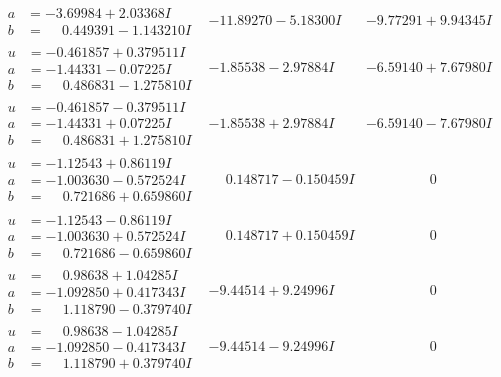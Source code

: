 \documentclass[1p]{elsarticle_modified}
\theoremstyle{definition}
\begin{document}
$$\begin{array}{c|c|c}
\begin{aligned}
a &= -3.69984 + 2.03368 I \\
b &= \phantom{-}0.449391 - 1.143210 I\end{aligned}
 & -11.89270 - 5.18300 I & -9.77291 + 9.94345 I \\ \hline\begin{aligned}
u &= -0.461857 + 0.379511 I \\
a &= -1.44331 - 0.07225 I \\
b &= \phantom{-}0.486831 - 1.275810 I\end{aligned}
 & -1.85538 - 2.97884 I & -6.59140 + 7.67980 I \\ \hline\begin{aligned}
u &= -0.461857 - 0.379511 I \\
a &= -1.44331 + 0.07225 I \\
b &= \phantom{-}0.486831 + 1.275810 I\end{aligned}
 & -1.85538 + 2.97884 I & -6.59140 - 7.67980 I \\ \hline\begin{aligned}
u &= -1.12543 + 0.86119 I \\
a &= -1.003630 - 0.572524 I \\
b &= \phantom{-}0.721686 + 0.659860 I\end{aligned}
 & \phantom{-}0.148717 - 0.150459 I & \phantom{-0.000000 } 0 \\ \hline\begin{aligned}
u &= -1.12543 - 0.86119 I \\
a &= -1.003630 + 0.572524 I \\
b &= \phantom{-}0.721686 - 0.659860 I\end{aligned}
 & \phantom{-}0.148717 + 0.150459 I & \phantom{-0.000000 } 0 \\ \hline\begin{aligned}
u &= \phantom{-}0.98638 + 1.04285 I \\
a &= -1.092850 + 0.417343 I \\
b &= \phantom{-}1.118790 - 0.379740 I\end{aligned}
 & -9.44514 + 9.24996 I & \phantom{-0.000000 } 0 \\ \hline\begin{aligned}
u &= \phantom{-}0.98638 - 1.04285 I \\
a &= -1.092850 - 0.417343 I \\
b &= \phantom{-}1.118790 + 0.379740 I\end{aligned}
 & -9.44514 - 9.24996 I & \phantom{-0.000000 } 0 \\ \hline\begin{aligned}

\end{aligned}
\end{array}$$
\end{document}

